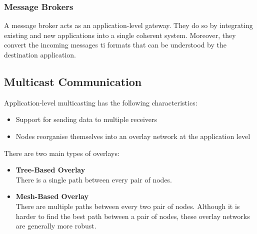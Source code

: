 \documentclass{article}
\begin{document}
\subsubsection{Message Brokers}
A message broker acts as an application-level gateway. They do so by integrating existing and new applications into a single coherent system. Moreover, they convert the incoming messages ti formats that can be understood by the destination application.

\subsection{Multicast Communication}
Application-level multicasting has the following characteristics:

\begin{itemize}
	\item Support for sending data to multiple receivers
	\item Nodes reorganise themselves into an overlay network at the application level
\end{itemize}

\noindent There are two main types of overlays:

\begin{itemize}
	\item \textbf{Tree-Based Overlay} \\
	There is a single path between every pair of nodes.
	
	\item \textbf{Mesh-Based Overlay} \\
	There are multiple paths between every two pair of nodes. Although it is harder to find the best path between a pair of nodes, these overlay networks are generally more robust.
\end{itemize}
\end{document}
